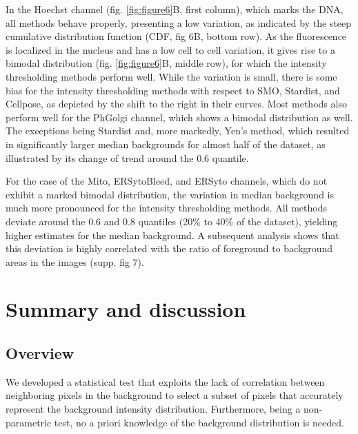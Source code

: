\documentclass[article]{jss}
\begin{document}
	In the Hoechst channel (fig. \ref{fig:figure6}B, first column), which marks the DNA, all methods behave properly, presenting a low variation, as indicated by the steep cumulative distribution function (CDF, fig 6B, bottom row). As the fluorescence is localized in the nucleus and has a low cell to cell variation, it gives rise to a bimodal distribution (fig. \ref{fig:figure6}B, middle row), for which the intensity thresholding methods perform well. While the variation is small, there is some bias for the intensity thresholding methods with respect to SMO, Stardist, and Cellpose, as depicted by the shift to the right in their curves. Most methods also perform well for the PhGolgi channel, which shows a bimodal distribution as well. The exceptions being Stardist and, more markedly, Yen’s method, which resulted in significantly larger median backgrounds for almost half of the dataset, as illustrated by its change of trend around the 0.6 quantile.

	For the case of the Mito, ERSytoBleed, and ERSyto channels, which do not exhibit a marked bimodal distribution, the variation in median background is much more pronounced for the intensity thresholding methods. All methods deviate around the 0.6 and 0.8 quantiles (20\% to 40\% of the dataset), yielding higher estimates for the median background. A subsequent analysis shows that this deviation is highly correlated with the ratio of foreground to background areas in the images (supp. fig 7).



\section{Summary and discussion} \label{sec:summary}

\subsection{Overview}

	We developed a statistical test that exploits the lack of correlation between neighboring pixels in the background to select a subset of pixels that accurately represent the background intensity distribution. Furthermore, being a non-parametric test, no a priori knowledge of the background distribution is needed.
\end{document}
